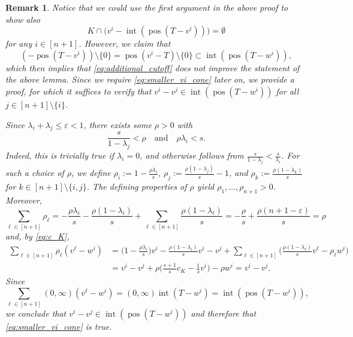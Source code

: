 \documentclass{amsart}
\newtheorem{remark}[theorem]{Remark}
\DeclareMathOperator{\pos}{pos}
\DeclareMathOperator{\inte}{int}
\begin{document}
\begin{remark}
Notice that we could use the first argument in the above proof to show also
\begin{equation}\label{eq:additional_cutoff}
	K \cap \big( v^i - \inte(\pos( T - v^i )) \big)
   	= \emptyset
\end{equation}
for any $i \in [n+1]$.
However, we claim that
\begin{equation}\label{eq:smaller_vi_cone}
	(- \pos( T - v^i )) \setminus \{ 0 \}
		= \pos(v^i - T) \setminus \{ 0 \}
		\subset \inte(\pos( T - w^i )),
\end{equation}
which then implies that \eqref{eq:additional_cutoff} does not improve the statement of the above lemma.
Since we require \eqref{eq:smaller_vi_cone} later on,
we provide a proof,
for which it suffices to verify that $v^i - v^j \in \inte(\pos(T - w^i))$ for all $j \in [n+1] \setminus \{ i \}$.

Since $\lambda_i + \lambda_j \leq \varepsilon < 1$,
there exists some $\rho > 0$ with
\[
	\frac{s}{1 - \lambda_j} < \rho
        \quad \text{and} \quad
    \rho \lambda_i < s.
\]
Indeed, this is trivially true if $\lambda_i = 0$,
and otherwise follows from $\frac{s}{1 - \lambda_j} < \frac{s}{\lambda_i}$.
For such a choice of $\rho$, we define
$\rho_i := 1 - \frac{\rho \lambda_i}{s}$,
$\rho_j := \frac{\rho (1 - \lambda_j)}{s} - 1$,
and $\rho_k := \frac{\rho (1 - \lambda_k)}{s}$ for $k \in [n+1] \setminus \{i,j\}$.
The defining properties of $\rho$ yield $\rho_1, \dots, \rho_{n+1} > 0$.
Moreover,
\[
	\sum_{\ell \in [n+1]} \rho_\ell
	= - \frac{\rho \lambda_i}{s} - \frac{\rho (1 - \lambda_i)}{s} + \sum_{\ell \in [n+1]} \frac{\rho (1 - \lambda_\ell)}{s}
	= - \frac{\rho}{s} + \frac{\rho (n + 1 - \varepsilon)}{s}
	= \rho
\]
and, by \eqref{eq:c_K},
\begin{align*}
	\sum_{\ell \in [n+1]} \rho_\ell (v^\ell - w^i)
	& = \bigg( 1 - \frac{\rho \lambda_i}{s} \bigg) v^i - \frac{\rho (1 - \lambda_i)}{s} v^i - v^j + \sum_{\ell \in [n+1]} \bigg( \frac{\rho (1 - \lambda_\ell)}{s} v^\ell - \rho_\ell w^i \bigg)
    \\
	& = v^i - v^j + \rho \bigg( \frac{s+1}{s} c_K - \frac{1}{s} v^i \bigg) - \rho w^i
	= v^i - v^j.
\end{align*}
Since
\[
    \sum_{\ell \in [n+1]} (0,\infty) (v^\ell - w^i)
    = (0,\infty) \inte(T - w^i)
    = \inte(\pos( T - w^i )),
\]
we conclude that $v^i - v^j \in \inte(\pos( T - w^i ))$ and therefore that \eqref{eq:smaller_vi_cone} is true.
\end{remark}
\end{document}
